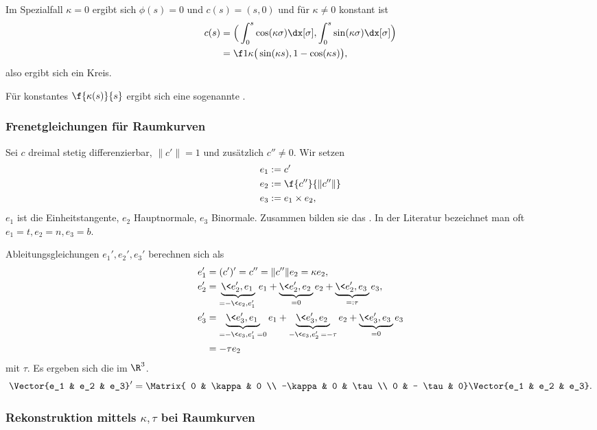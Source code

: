 Im Spezialfall $\kappa = 0$ ergibt sich $\phi(s) = 0$ und $c(s) = (s, 0)$ und für $\kappa \neq 0$ konstant ist
\begin{align*}
	c(s) &= \Big( \int_0^s \cos (\kappa \sigma) \dx[\sigma] , \int_0^s \sin(\kappa \sigma) \dx[\sigma] \Big) \\
	&= \f 1\kappa \big( \sin (\kappa s), 1 - \cos (\kappa s) \big),
\end{align*}
also ergibt sich ein Kreis.

Für konstantes $\f{\kappa(s)}{s}$ ergibt sich eine sogenannte .


\subsubsection{Frenetgleichungen für Raumkurven}

Sei $c$ dreimal stetig differenzierbar, $\|c'\| = 1$ und zusätzlich $c'' \neq 0$.
Wir setzen
\begin{align*}
	e_1 &:= c' \\
	e_2 &:= \f {c''}{\|c''\|} \\
	e_3 &:= e_1 \times e_2,
\end{align*}
$e_1$ ist die Einheitstangente, $e_2$ Hauptnormale, $e_3$ Binormale.
Zusammen bilden sie das .
In der Literatur bezeichnet man oft $e_1 = t, e_2 = n, e_3 = b$.

Ableitungsgleichungen $e_1', e_2', e_3'$ berechnen sich als
\begin{align*}
	e_1' &= (c')' = c'' = \|c''\| e_2 = \kappa e_2, \\
	e_2' &= \underbrace{\<e_2', e_1\>}_{=-\<e_2, e_1'\>} e_1 + \underbrace{\<e_2', e_2\>}_{=0} e_2 + \underbrace{\<e_2', e_3\>}_{=: \tau} e_3, \\
	e_3' &= \underbrace{\<e_3', e_1\>}_{=-\<e_3, e_1'\> = 0} e_1 + \underbrace{\<e_3', e_2\>}_{-\<e_3, e_2'\> = -\tau} e_2 + \underbrace{\< e_3', e_3 \>}_{=0} e_3 \\
	&= - \tau e_2
\end{align*}
mit  $\tau$.
Es ergeben sich die  im $\R^3$.
\[
	\Vector{e_1 & e_2 & e_3}'
	= \Matrix{ 0 & \kappa & 0 \\ -\kappa & 0 & \tau \\ 0 & - \tau & 0}
	\Vector{e_1 & e_2 & e_3}.
\]

\subsubsection{Rekonstruktion mittels $\kappa, \tau$ bei Raumkurven}

